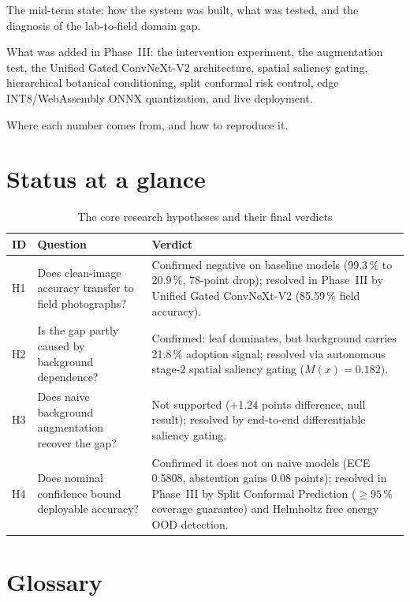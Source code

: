 \documentclass[12pt,a4paper]{report}
\newcommand{\tabfont}{\small}
\begin{document}
\begin{description}[leftmargin=1.2em,labelindent=0em,itemsep=3pt]
\item[Part I] The mid-term state: how the system was built, what was tested, and the diagnosis of the lab-to-field domain gap.
\item[Part II] What was added in Phase~III: the intervention experiment, the augmentation test, the Unified Gated ConvNeXt-V2 architecture, spatial saliency gating, hierarchical botanical conditioning, split conformal risk control, edge INT8/WebAssembly ONNX quantization, and live deployment.
\item[Appendix] Where each number comes from, and how to reproduce it.
\end{description}

\section*{Status at a glance}

\begin{table}[H]
\centering
\caption{The core research hypotheses and their final verdicts}
\label{tab:verdicts}
\tabfont
\begin{tabularx}{\textwidth}{@{}lYY@{}}
\toprule
\textbf{ID} & \textbf{Question} & \textbf{Verdict} \\
\midrule
H1 & Does clean-image accuracy transfer to field photographs? & Confirmed negative on baseline models (99.3\,\% to 20.9\,\%, 78-point drop); resolved in Phase~III by Unified Gated ConvNeXt-V2 (85.59\,\% field accuracy). \\
H2 & Is the gap partly caused by background dependence? & Confirmed: leaf dominates, but background carries 21.8\,\% adoption signal; resolved via autonomous stage-2 spatial saliency gating ($M(x) = 0.182$). \\
H3 & Does naive background augmentation recover the gap? & Not supported (+1.24 points difference, null result); resolved by end-to-end differentiable saliency gating. \\
H4 & Does nominal confidence bound deployable accuracy? & Confirmed it does not on naive models (ECE 0.5808, abstention gains 0.08 points); resolved in Phase~III by Split Conformal Prediction ($\ge 95\,\%$ coverage guarantee) and Helmholtz free energy OOD detection. \\
\bottomrule
\end{tabularx}
\end{table}

\section*{Glossary}
\end{document}
